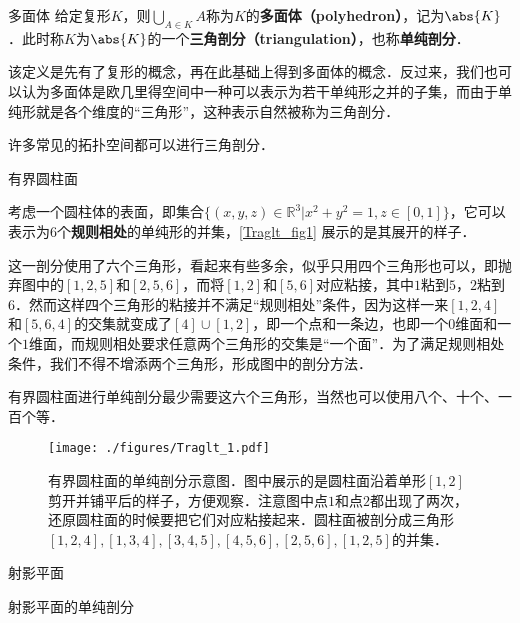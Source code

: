 

\begin{definition}{多面体}
给定复形$K$，则$\bigcup\limits_{A\in K}A$称为$K$的\textbf{多面体（polyhedron）}，记为$\abs{K}$．此时称$K$为$\abs{K}$的一个\textbf{三角剖分（triangulation）}，也称\textbf{单纯剖分}．
\end{definition}

该定义是先有了复形的概念，再在此基础上得到多面体的概念．反过来，我们也可以认为多面体是欧几里得空间中一种可以表示为若干单纯形之并的子集，而由于单纯形就是各个维度的“三角形”，这种表示自然被称为三角剖分．

许多常见的拓扑空间都可以进行三角剖分．

\begin{example}{有界圆柱面}

考虑一个圆柱体的表面，即集合$\{(x, y, z)\in\mathbb{R}^3|x^2+y^2=1, z\in [0, 1]\}$，它可以表示为$6$个\textbf{规则相处}的单纯形的并集，\autoref{Traglt_fig1} 展示的是其展开的样子．

这一剖分使用了六个三角形，看起来有些多余，似乎只用四个三角形也可以，即抛弃图中的$[1,2,5]$和$[2,5,6]$，而将$[1, 2]$和$[5, 6]$对应粘接，其中$1$粘到$5$，$2$粘到$6$．然而这样四个三角形的粘接并不满足“规则相处”条件，因为这样一来$[1, 2, 4]$和$[5, 6, 4]$的交集就变成了$[4]\cup[1, 2]$，即一个点和一条边，也即一个$0$维面和一个$1$维面，而规则相处要求任意两个三角形的交集是“一个面”．为了满足规则相处条件，我们不得不增添两个三角形，形成图中的剖分方法．

有界圆柱面进行单纯剖分最少需要这六个三角形，当然也可以使用八个、十个、一百个等．

\end{example}

\begin{figure}[ht]
\centering
\texttt{[image: ./figures/Traglt\_1.pdf]}
\caption{有界圆柱面的单纯剖分示意图．图中展示的是圆柱面沿着单形$[1, 2]$剪开并铺平后的样子，方便观察．注意图中点$1$和点$2$都出现了两次，还原圆柱面的时候要把它们对应粘接起来．圆柱面被剖分成三角形$[1,2,4], [1,3,4], [3,4,5], [4,5,6], [2,5,6], [1,2,5]$的并集．} \label{Traglt_fig1}
\end{figure}

\begin{example}{射影平面}

射影平面的单纯剖分

\end{example}








